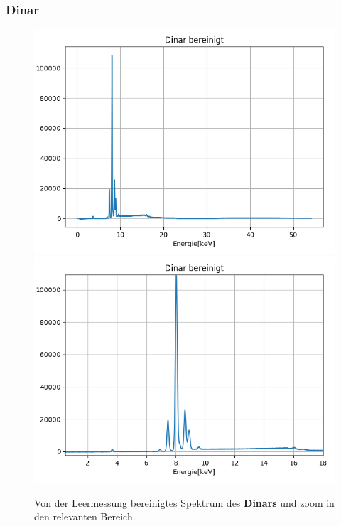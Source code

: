 \documentclass[12pt,a4paper]{article}
\begin{document}
\subsubsection{Dinar}
\begin{figure}[H]
\centering
\includegraphics[scale=0.49]{Bilder/roentgen_spektren/dinar_0.png}
\includegraphics[scale=0.49]{Bilder/roentgen_spektren/dinar_1.png}
\caption{Von der Leermessung bereinigtes Spektrum des \textbf{Dinars} und zoom in den relevanten Bereich.}
\label{fig:prop_dinar}
\end{figure}
\end{document}
